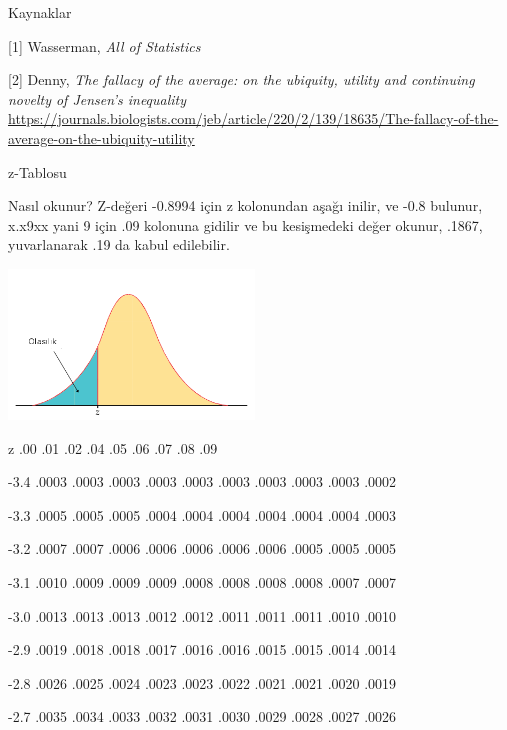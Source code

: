 \documentclass[12pt,fleqn]{article}\usepackage{../../common}
\begin{document}
Kaynaklar

[1] Wasserman, {\em All of Statistics}

[2] Denny, {\em The fallacy of the average: on the ubiquity, utility and continuing novelty of Jensen's inequality}
    \url{https://journals.biologists.com/jeb/article/220/2/139/18635/The-fallacy-of-the-average-on-the-ubiquity-utility}

\newpage

z-Tablosu

Nasıl okunur? Z-değeri -0.8994 için z kolonundan aşağı inilir, ve -0.8
bulunur, x.x9xx yani 9 için .09 kolonuna gidilir ve bu kesişmedeki değer
okunur, .1867, yuvarlanarak .19 da kabul edilebilir. 

\includegraphics[height=4cm]{stat_appendix_02.png}

z \hspace{1em} .00 \hspace{1em} .01 \hspace{1em} .02 \hspace{1em} .04 \hspace{1em} .05 \hspace{1em} .06 \hspace{1em} .07 \hspace{1em} .08 \hspace{1em} .09

-3.4 .0003 .0003 .0003 .0003 .0003 .0003 .0003 .0003 .0003 .0002

-3.3 .0005 .0005 .0005 .0004 .0004 .0004 .0004 .0004 .0004 .0003

-3.2 .0007 .0007 .0006 .0006 .0006 .0006 .0006 .0005 .0005 .0005

-3.1 .0010 .0009 .0009 .0009 .0008 .0008 .0008 .0008 .0007 .0007

-3.0 .0013 .0013 .0013 .0012 .0012 .0011 .0011 .0011 .0010 .0010

-2.9 .0019 .0018 .0018 .0017 .0016 .0016 .0015 .0015 .0014 .0014

-2.8 .0026 .0025 .0024 .0023 .0023 .0022 .0021 .0021 .0020 .0019

-2.7 .0035 .0034 .0033 .0032 .0031 .0030 .0029 .0028 .0027 .0026
\end{document}
